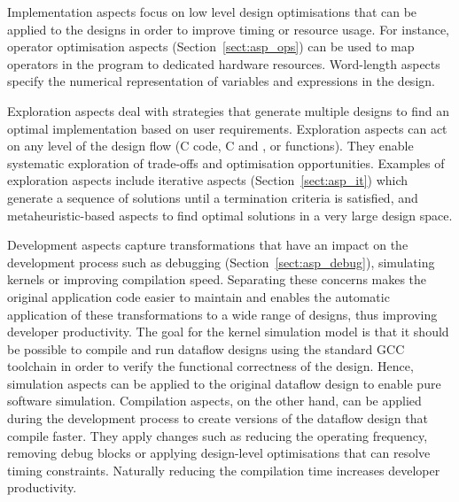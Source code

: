 \vspace*{0.5ex}
 Implementation aspects focus on low level design optimisations that can be applied to the \MAXC{} designs in order to improve timing or resource usage. For instance, operator optimisation aspects (Section~\ref{sect:asp_ops}) can be used to map operators in the program to dedicated hardware resources. Word-length aspects
specify the numerical representation of variables and expressions in the design.

\vspace*{0.5ex}
 Exploration aspects deal with
strategies that generate multiple designs to find an optimal
implementation based on user requirements. Exploration aspects can act
on any level of the design flow (C code, C and \MAXC{}, or \MAXC{}
functions). They enable systematic exploration of trade-offs and
optimisation opportunities. Examples of exploration aspects include
iterative aspects (Section~\ref{sect:asp_it}) which generate a
sequence of solutions until a termination criteria is satisfied, and
metaheuristic-based aspects to find optimal solutions in a very large
design space.

\vspace*{0.5ex}
 Development aspects capture transformations that have an impact on the
development process such as debugging (Section~\ref{sect:asp_debug}), simulating kernels or improving
compilation speed. Separating these concerns makes the original
application code easier to maintain and enables the automatic
application of these transformations to a wide range of designs, thus
improving developer productivity. The goal for the \MAXC{} kernel simulation model is that it should be possible to compile and run dataflow designs using the standard GCC
toolchain in order to verify the functional correctness of the
design. Hence, simulation aspects can be applied to the original dataflow design to
enable pure software simulation. Compilation aspects, on the other hand, can be applied during the development process to create versions of the dataflow design that compile faster. They apply
changes such as reducing the operating frequency, removing debug
blocks or applying design-level optimisations that can resolve timing
constraints. Naturally reducing the compilation time increases
developer productivity.



